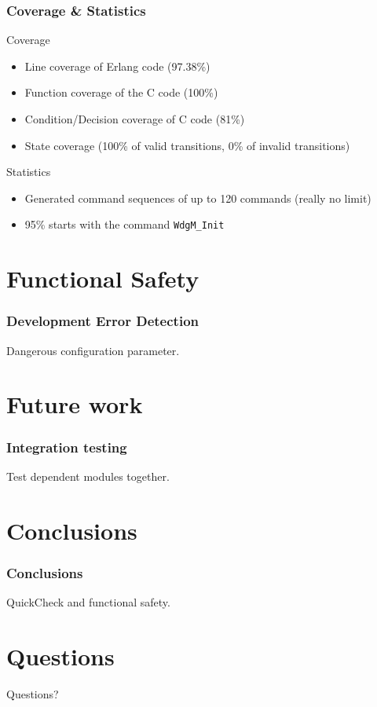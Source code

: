 \documentclass{beamer}
\begin{document}
\begin{frame}[fragile]
  \frametitle{Coverage \& Statistics}
  \begin{block}{Coverage}
    \begin{itemize}
      \item Line coverage of Erlang code (97.38\%)
      \item Function coverage of the C code (100\%)
      \item Condition/Decision coverage of C code (81\%)
      \item State coverage (100\% of valid transitions, 0\% of invalid transitions)
    \end{itemize}
  \end{block}
  \begin{block}{Statistics}
    \begin{itemize}
      \item Generated command sequences of up to 120 commands (really no limit)
      \item 95\% starts with the command \verb!WdgM_Init!
    \end{itemize}
  \end{block}
\end{frame}

\section{Functional Safety}
\begin{frame}[fragile]
  \frametitle{Development Error Detection}
  Dangerous configuration parameter.
\end{frame}

\section{Future work}
\begin{frame}[fragile]
  \frametitle{Integration testing}
  Test dependent modules together.
\end{frame}

\section{Conclusions}
\begin{frame}
  \frametitle{Conclusions}
  QuickCheck and functional safety.
\end{frame}

\section{Questions}
\begin{frame}
  \Huge{\centerline{Questions?}}
\end{frame}
\end{document}
